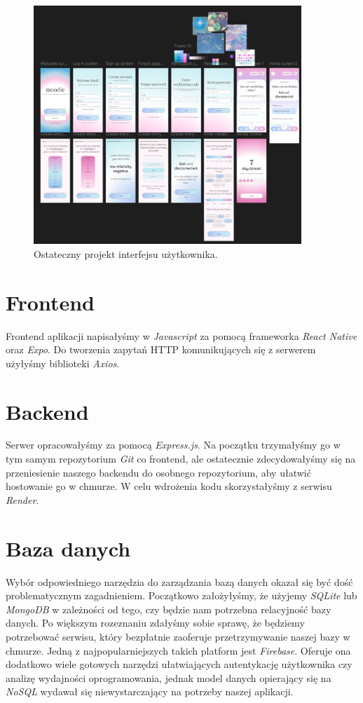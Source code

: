 \documentclass[inz, shortabstract]{iithesis}
\begin{document}
\begin{figure}[!h]
\centering
\includegraphics[width=0.9\textwidth]{figma-ui.png} 
\caption{Ostateczny projekt interfejsu użytkownika.}
\end{figure}

\section{Frontend}
Frontend aplikacji napisałyśmy w \textit{Javascript} za pomocą frameworka \textit{React Native} oraz \textit{Expo}. Do tworzenia zapytań HTTP komunikujących się z serwerem użyłyśmy biblioteki \textit{Axios}.

\section{Backend}
Serwer opracowałyśmy za pomocą \textit{Express.js}. Na początku trzymałyśmy go w tym samym repozytorium \textit{Git} co frontend, ale ostatecznie zdecydowałyśmy się na przeniesienie naszego backendu do osobnego repozytorium, aby ułatwić hostowanie go w chmurze. W celu wdrożenia kodu skorzystałyśmy z serwisu \textit{Render}.
\section{Baza danych}
Wybór odpowiedniego narzędzia do zarządzania bazą danych okazał się być dość problematycznym zagadnieniem. Początkowo założyłyśmy, że użyjemy \textit{SQLite} lub \textit{MongoDB} w zależności od tego, czy będzie nam potrzebna relacyjność bazy danych. Po większym rozeznaniu zdałyśmy sobie sprawę, że będziemy potrzebować serwisu, który bezpłatnie zaoferuje przetrzymywanie naszej bazy w chmurze. Jedną z najpopularniejszych takich platform jest \textit{Firebase}. Oferuje ona dodatkowo wiele gotowych narzędzi ułatwiających autentykację użytkownika czy analizę wydajności oprogramowania, jednak model danych opierający się na \textit{NoSQL} wydawał się niewystarczający na potrzeby naszej aplikacji. 
\end{document}
